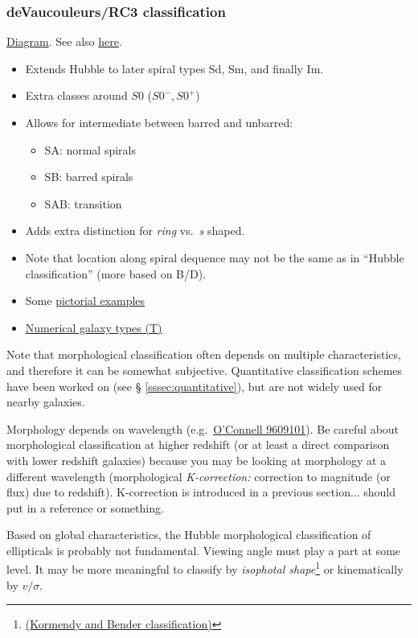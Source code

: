 \documentclass{article}
\newcommand{\mynotes}[1]{\textcolor{cadmiumgreen}{#1}}
\newcommand{\myref}[1]{\textcolor{pinegreen}{\S{} \ref{#1}}}
\begin{document}
\subsubsection{deVaucouleurs/RC3 classification}
\href{http://astronomy.nmsu.edu/holtz/a555/html/diagrams/a616/rc3class.htm}
{Diagram}.
See also \href{http://astronomy.as.virginia.edu}{here}.
\begin{itemize}
    \item Extends Hubble to later spiral types Sd, Sm, and finally Im.
    \item Extra classes around $S0$ ($S0^{-}, S0^{+}$)
    \item Allows for intermediate between barred and unbarred:
        \begin{itemize}
            \item SA: normal spirals
            \item SB: barred spirals
            \item SAB: transition
        \end{itemize}
    \item Adds extra distinction for \emph{ring} vs.\ \emph{s} shaped.
    \item Note that location along spiral dequence may not be the same as in
        ``Hubble classification'' (more based on B/D).
    \item Some \href{http://astronomy.as.virginia.edu}
        {{pictorial examples}}
    \item \href{http://astronomy.nmsu.edu/holtz/a555/html/diagrams/a616/numtype.htm}
        {{Numerical galaxy types (T)}}
\end{itemize}
Note that morphological classification often depends on multiple
characteristics, and therefore it can be somewhat subjective.
Quantitative classification schemes have been worked on
(see \myref{sssec:quantitative}),
but are not widely used for nearby galaxies.

Morphology depends on wavelength
(e.g.\ \href{http://ned.ipac.caltech.edu/level5/Kuchinski/frames.html}
{O'Connell 9609101}).
Be careful about morphological classification at higher redshift
(or at least a direct comparison with lower redshift galaxies)
because you may be looking at morphology at a different wavelength
(morphological \textit{K-correction:} correction to magnitude (or flux) due
to redshift). \mynotes{K-correction is introduced in a previous section... should put
in a reference or something.}

Based on global characteristics, the Hubble morphological classification of
ellipticals is probably not fundamental.
Viewing angle must play a part at some level.
It may be more meaningful to classify
by \emph{isophotal shape}\footnote{
    \href{http://astronomy.as.virginia.edu}{(Kormendy and Bender classification)}}
or kinematically by $v/\sigma$.
\end{document}
